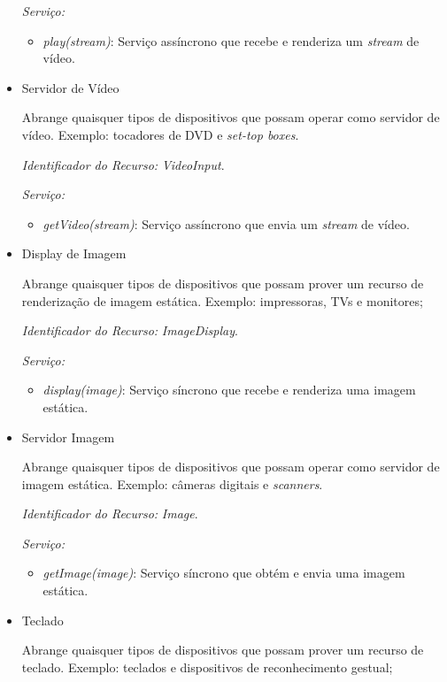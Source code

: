 \begin{itemize}
		\emph{Serviço:} 
		\begin{itemize}
			\item \emph{play(stream)}: Serviço assíncrono que recebe e renderiza um \emph{stream} de vídeo.
		\end{itemize}

	\item Servidor de Vídeo
		
		Abrange quaisquer tipos de dispositivos que possam operar como servidor de vídeo. Exemplo: tocadores de DVD e \emph{set-top boxes}.

		\emph{Identificador do Recurso:} \emph{VideoInput}.

		\emph{Serviço:}
		\begin{itemize}
			\item \emph{getVideo(stream)}: Serviço assíncrono que envia um \emph{stream} de vídeo.
		\end{itemize}

	\item Display de Imagem
		
		Abrange quaisquer tipos de dispositivos que possam prover um recurso de renderização de imagem estática. Exemplo: impressoras, TVs e monitores;

		\emph{Identificador do Recurso:} \emph{ImageDisplay}.

		\emph{Serviço:}
		\begin{itemize}
			\item \emph{display(image)}: Serviço síncrono que recebe e renderiza uma imagem estática.
		\end{itemize}

	\item Servidor Imagem
		
		Abrange quaisquer tipos de dispositivos que possam operar como servidor de imagem estática. Exemplo: câmeras digitais e \emph{scanners}.

		\emph{Identificador do Recurso:} \emph{Image}.

		\emph{Serviço:} 
		\begin{itemize}
			\item \emph{getImage(image)}: Serviço síncrono que obtém e envia uma imagem estática.
		\end{itemize}
	\item Teclado
		
		Abrange quaisquer tipos de dispositivos que possam prover um recurso de teclado. Exemplo: teclados e dispositivos de reconhecimento gestual;


\end{itemize}
